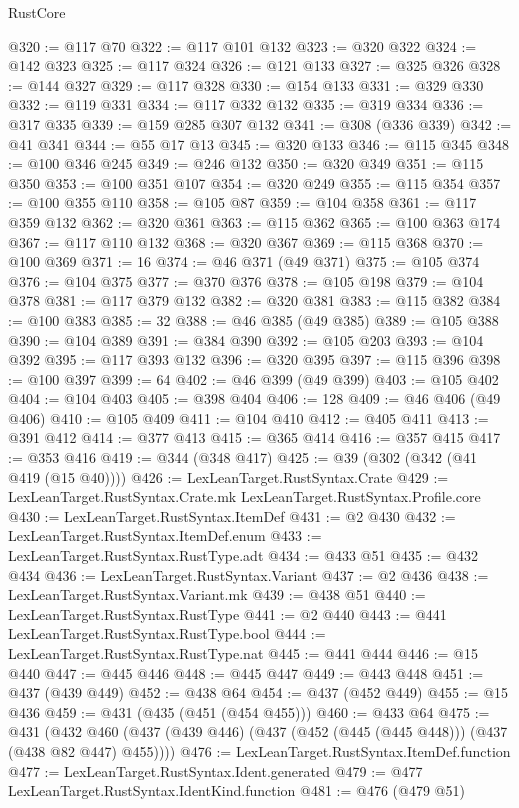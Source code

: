 \begin{lexlean}{RustCore}
\begin{coremodule}
@320 := @117 @70
@322 := @117 @101 @132
@323 := @320 @322
@324 := @142 @323
@325 := @117 @324
@326 := @121 @133
@327 := @325 @326
@328 := @144 @327
@329 := @117 @328
@330 := @154 @133
@331 := @329 @330
@332 := @119 @331
@334 := @117 @332 @132
@335 := @319 @334
@336 := @317 @335
@339 := @159 @285 @307 @132
@341 := @308 (@336 @339)
@342 := @41 @341
@344 := @55 @17 @13
@345 := @320 @133
@346 := @115 @345
@348 := @100 @346 @245
@349 := @246 @132
@350 := @320 @349
@351 := @115 @350
@353 := @100 @351 @107
@354 := @320 @249
@355 := @115 @354
@357 := @100 @355 @110
@358 := @105 @87
@359 := @104 @358
@361 := @117 @359 @132
@362 := @320 @361
@363 := @115 @362
@365 := @100 @363 @174
@367 := @117 @110 @132
@368 := @320 @367
@369 := @115 @368
@370 := @100 @369
@371 := 16
@374 := @46 @371 (@49 @371)
@375 := @105 @374
@376 := @104 @375
@377 := @370 @376
@378 := @105 @198
@379 := @104 @378
@381 := @117 @379 @132
@382 := @320 @381
@383 := @115 @382
@384 := @100 @383
@385 := 32
@388 := @46 @385 (@49 @385)
@389 := @105 @388
@390 := @104 @389
@391 := @384 @390
@392 := @105 @203
@393 := @104 @392
@395 := @117 @393 @132
@396 := @320 @395
@397 := @115 @396
@398 := @100 @397
@399 := 64
@402 := @46 @399 (@49 @399)
@403 := @105 @402
@404 := @104 @403
@405 := @398 @404
@406 := 128
@409 := @46 @406 (@49 @406)
@410 := @105 @409
@411 := @104 @410
@412 := @405 @411
@413 := @391 @412
@414 := @377 @413
@415 := @365 @414
@416 := @357 @415
@417 := @353 @416
@419 := @344 (@348 @417)
@425 := @39 (@302 (@342 (@41 @419 (@15 @40))))
@426 := LexLeanTarget.RustSyntax.Crate
@429 := LexLeanTarget.RustSyntax.Crate.mk LexLeanTarget.RustSyntax.Profile.core
@430 := LexLeanTarget.RustSyntax.ItemDef
@431 := @2 @430
@432 := LexLeanTarget.RustSyntax.ItemDef.enum
@433 := LexLeanTarget.RustSyntax.RustType.adt
@434 := @433 @51
@435 := @432 @434
@436 := LexLeanTarget.RustSyntax.Variant
@437 := @2 @436
@438 := LexLeanTarget.RustSyntax.Variant.mk
@439 := @438 @51
@440 := LexLeanTarget.RustSyntax.RustType
@441 := @2 @440
@443 := @441 LexLeanTarget.RustSyntax.RustType.bool
@444 := LexLeanTarget.RustSyntax.RustType.nat
@445 := @441 @444
@446 := @15 @440
@447 := @445 @446
@448 := @445 @447
@449 := @443 @448
@451 := @437 (@439 @449)
@452 := @438 @64
@454 := @437 (@452 @449)
@455 := @15 @436
@459 := @431 (@435 (@451 (@454 @455)))
@460 := @433 @64
@475 := @431
    (@432 @460 (@437 (@439 @446) (@437 (@452 (@445 (@445 @448))) (@437 (@438 @82 @447) @455))))
@476 := LexLeanTarget.RustSyntax.ItemDef.function
@477 := LexLeanTarget.RustSyntax.Ident.generated
@479 := @477 LexLeanTarget.RustSyntax.IdentKind.function
@481 := @476 (@479 @51)

\end{coremodule}
\end{lexlean}
